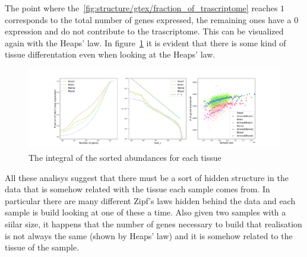 The point where the~\ref{fig:structure/gtex/fraction_of_trascriptome} reaches $1$ corresponds to the total number of genes expressed, the remaining ones have a $0$ expression and do not contribute to the trascriptome. This can be visualized again with the Heaps' law. In figure~\ref{fig:structure/gtex/heaps_tissue} it is evident that there is some kind of tissue differentation even when looking at the Heaps' law.
\begin{figure}[htb!]
  \centering
  \includegraphics[width=0.6\linewidth]{pictures/structure/gtex/heaps_tissue.pdf}
  \caption{The integral of the sorted abundances for each tissue}
  \label{fig:structure/gtex/heaps_tissue}
\end{figure}

All these analisys suggest that there must be a sort of hidden structure in the data that is somehow related with the tissue each sample comes from. In particular there are many different Zipf's laws hidden behind the data and each sample is build looking at one of these a time. Also given two samples with a siilar size, it happens that the number of genes necessary to build that realisation is not always the same (shown by Heaps' law) and it is somehow related to the tissue of the sample.
